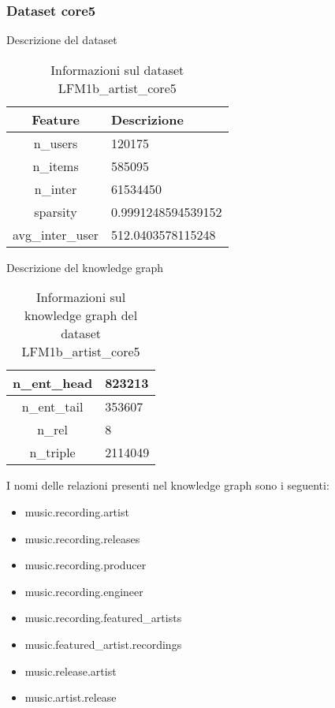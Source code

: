 \subsubsection{Dataset core5}

Descrizione del dataset
\begin{table}[H]
    \centering
    \footnotesize
    \begin{tabularx}{\textwidth}{|c|X|}
        \hline
        \textbf{Feature} & \textbf{Descrizione} \\
        \hline
        n\_users & 120175 \\
        \hline
        n\_items & 585095 \\
        \hline
        n\_inter & 61534450 \\
        \hline
        sparsity & 0.9991248594539152 \\
        \hline
        avg\_inter\_user & 512.0403578115248 \\
        \hline
    \end{tabularx}
    \caption{Informazioni sul dataset LFM1b\_artist\_core5}
    \label{tab:dataset_info}
\end{table}


\noindent Descrizione del knowledge graph
\begin{table}[H]
    \centering
    \footnotesize
    \begin{tabularx}{\textwidth}{|c|X|}
        \hline
        n\_ent\_head & 823213 \\
        \hline
        n\_ent\_tail & 353607 \\
        \hline
        n\_rel & 8 \\
        \hline
        n\_triple & 2114049 \\
        \hline
    \end{tabularx}
    \caption{Informazioni sul knowledge graph del dataset LFM1b\_artist\_core5}
    \label{tab:dataset_info}
\end{table}

\noindent I nomi delle relazioni presenti nel knowledge graph sono i seguenti:
\begin{itemize}
    \item music.recording.artist
    \item music.recording.releases
    \item music.recording.producer
    \item music.recording.engineer
    \item music.recording.featured\_artists
    \item music.featured\_artist.recordings
    \item music.release.artist
    \item music.artist.release
\end{itemize}




